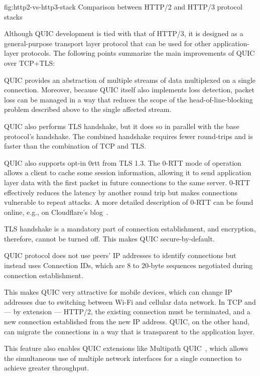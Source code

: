 \begin{myFigure} {fig:http2-vs-http3-stack} {Comparison between HTTP/2 and HTTP/3 protocol stacks}

  

\end{myFigure}

Although QUIC development is tied with that of HTTP/3, it is designed as a general-purpose transport
layer protocol that can be used for other application-layer protocols. The following points
summarize the main improvements of QUIC over TCP+TLS:

\begin{itemize}

     QUIC provides an abstraction of multiple streams of data multiplexed
on a single connection. Moreover, because QUIC itself also implements loss detection, packet loss
can be managed in a way that reduces the scope of the \gls{head-of-line-blocking} problem described
above to the single affected stream.

     QUIC also performs TLS handshake, but it does so in
parallel with the base protocol's handshake. The combined handshake requires fewer round-trips and
is faster than the combination of TCP and TLS\@.

    QUIC also supports opt-in \gls{0rtt} from TLS 1.3. The 0-RTT mode of operation allows a client
to cache some session information, allowing it to send application layer data with the first packet
in future connections to the same server. 0-RTT effectively reduces the latency by another round
trip but makes connections vulnerable to repeat attacks. A more detailed description of 0-RTT can be
found online, e.g., on Cloudflare's blog~\cite{cloudflare-0rtt}.

     TLS handshake is a mandatory part of connection establishment, and
encryption, therefore, cannot be turned off. This makes QUIC secure-by-default.

     QUIC protocol does not use peers'
IP addresses to identify connections but instead uses Connection IDs, which are 8 to 20-byte
sequences negotiated during connection establishment.

    This makes QUIC very attractive for mobile devices, which can change IP addresses due to
switching between Wi-Fi and cellular data network. In TCP and --- by extension --- HTTP/2, the existing
connection must be terminated, and a new connection established from the new IP address. QUIC, on
the other hand, can migrate the connections in a way that is transparent to the application layer.

    This feature also enables QUIC extensions like Multipath
QUIC~\cite{draft-deconinck-quic-multipath-04}, which allows the simultaneous use of multiple network
interfaces for a single connection to achieve greater throughput.

\end{itemize}

